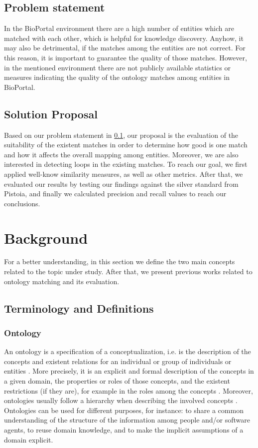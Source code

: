 \documentclass[runningheads]{llncs}
\begin{document}
\subsection{Problem statement} \label{problem}
In the BioPortal environment there are a high number of entities which are matched with each other, which is helpful for knowledge discovery. Anyhow, it may also be detrimental, if the matches among the entities are not correct. For this reason, it is important to guarantee the quality of those matches. However, in the mentioned environment there are not publicly available statistics or measures indicating the quality of the ontology matches among entities in BioPortal.

\subsection{Solution Proposal} \label{solution}
Based on our problem statement in \ref{problem}, our proposal is the evaluation of the suitability of the existent matches in order to determine how good is one match and how it affects the overall mapping among entities. Moreover, we are also interested in detecting loops in the existing matches. To reach our goal, we first applied well-know similarity measures, as well as other metrics. After that, we evaluated our results by testing our findings against the silver standard from Pistoia, and finally we calculated precision and recall values to reach our conclusions.

\section{Background} \label{background}
For a better understanding, in this section we define the two main concepts related to the topic under study. After that, we present previous works related to ontology matching and its evaluation.
\subsection{Terminology and Definitions} \label{terminology}
\subsubsection{Ontology} \label{ontology}
An ontology is a specification of a conceptualization, i.e. is the description of the concepts and existent relations for an individual or group of individuals or entities \cite{ref_url2}. More precisely, it is an explicit and formal description of the concepts in a given domain, the properties or roles of those concepts, and the existent restrictions (if they are), for example in the roles among the concepts \cite{Noy}. Moreover, ontologies usually follow a hierarchy when describing the involved concepts \cite{Kalfoglou}. Ontologies can be used for different purposes, for instance: to share a common understanding of the structure of the information among people and/or software agents, to reuse domain knowledge, and to make the implicit assumptions of a domain explicit\cite{Noy}.
\end{document}
